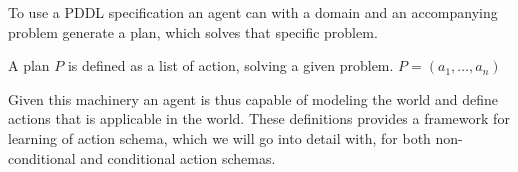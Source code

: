 \documentclass[../Master.tex]{subfiles}
\begin{document}
To use a PDDL specification an agent can with a domain and an accompanying problem generate a plan, which solves that specific problem.

\begin{definition} 
	A plan $P$ is defined as a list of action, solving a given problem.
	$P = (a_1,\dots,a_n)$
\end{definition}

Given this machinery an agent is thus capable of modeling the world and define actions that is applicable in the world. These definitions provides a framework for learning of action schema, which we will go into detail with, for both non-conditional and conditional action schemas.


	
	
\end{document}
